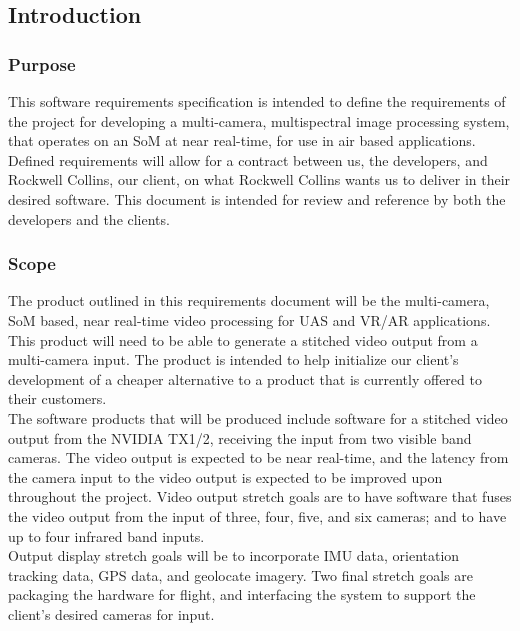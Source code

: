 \subsection{Introduction}

\subsubsection{Purpose}

This software requirements specification is intended to define the requirements of the 
project for developing a multi-camera, multispectral image processing system, that 
operates on an SoM at near real-time, for use in air based 
applications. Defined requirements will allow for a contract between us, the 
developers, and Rockwell Collins, our client, on what Rockwell Collins wants us to 
deliver in their desired software. This document is intended for review and reference 
by both the developers and the clients.\\

\subsubsection{Scope}

The product outlined in this requirements document will be the multi-camera, SoM based,
 near real-time video processing for UAS and VR/AR applications. This product will need to 
 be able to generate a stitched video output from a multi-camera input. The product is 
 intended to help initialize our client's development of a cheaper alternative to a 
 product that is currently offered to their customers.\\

The software products that will be produced include software for a stitched video output 
from the NVIDIA TX1/2, receiving the input from two visible band cameras. 
The video output is expected to be near real-time, and the latency from the camera 
input to the video output is expected to be improved upon throughout the project. Video 
output stretch goals are to have software that fuses the video output from the input of 
three, four, five, and six cameras; and to have up to four infrared band inputs.\\

Output display stretch goals will be to incorporate IMU data, orientation tracking 
data, GPS data, and geolocate imagery. Two final stretch goals are packaging the 
hardware for flight, and interfacing the system to support the client's desired 
cameras for input.\\

